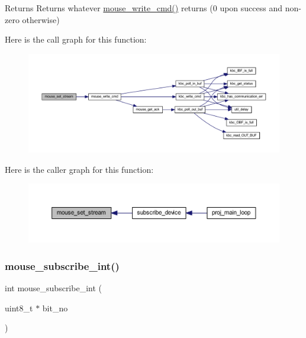 \begin{DoxyReturn}{Returns}
Returns whatever \mbox{\hyperlink{group__mouse_ga14261d6dca45cb7cc9c8a786739ac5a3}{mouse\+\_\+write\+\_\+cmd()}} returns (0 upon success and non-\/zero otherwise) 
\end{DoxyReturn}
Here is the call graph for this function\+:\nopagebreak
\begin{figure}[H]
\begin{center}
\leavevmode
\includegraphics[width=350pt]{group__mouse_ga7de2d644cbc4f0c10fa7888413230863_cgraph}
\end{center}
\end{figure}
Here is the caller graph for this function\+:\nopagebreak
\begin{figure}[H]
\begin{center}
\leavevmode
\includegraphics[width=350pt]{group__mouse_ga7de2d644cbc4f0c10fa7888413230863_icgraph}
\end{center}
\end{figure}
\mbox{\label{group__mouse_ga9da18257ff113b686bb826d154bfaa87}} 
\subsubsection{\texorpdfstring{mouse\+\_\+subscribe\+\_\+int()}{mouse\_subscribe\_int()}}
{\footnotesize\ttfamily int mouse\+\_\+subscribe\+\_\+int (\begin{DoxyParamCaption}\item[{uint8\+\_\+t $\ast$}]{bit\+\_\+no }\end{DoxyParamCaption})}



